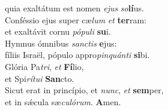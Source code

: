 \evenverse quia exaltátum est nomen \textit{e}\textit{jus} \textit{so}\textbf{lí}us.\\
\oddverse Conféssio ejus super cæ\textit{lum} \textit{et} \textbf{ter}ram:~\*\\
\oddverse et exaltávit cornu \textit{pó}\textit{pu}\textit{li} \textbf{su}i.\\
\evenverse Hymnus ómnibus \textit{san}\textit{ctis} \textbf{e}jus:~\*\\
\evenverse fíliis Israël, pópulo appro\textit{pin}\textit{quán}\textit{ti} \textbf{si}bi.\\
\oddverse Glória Pa\textit{tri}, \textit{et} \textbf{Fí}lio,~\*\\
\oddverse et Spi\textit{rí}\textit{tu}\textit{i} \textbf{San}cto.\\
\evenverse Sicut erat in princípio, et \textit{nunc}, \textit{et} \textbf{sem}per,~\*\\
\evenverse et in sǽcula sæ\textit{cu}\textit{ló}\textit{rum}. \textbf{A}men.\\
